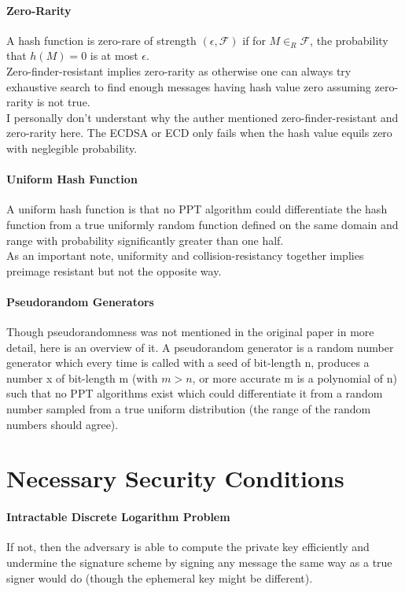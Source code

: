 \documentclass[12]{article}
\begin{document}
\paragraph{Zero-Rarity}
A hash function is zero-rare of strength $(\epsilon, \mathscr{F})$ if for $M\in _R \mathscr{F}$, the probability that $h(M)=0$ is at most $\epsilon$.
\\ Zero-finder-resistant implies zero-rarity as otherwise one can always try exhaustive search to find enough messages having hash value zero assuming zero-rarity is not true.
\\ I personally don't understant why the auther mentioned zero-finder-resistant and zero-rarity here. The ECDSA or ECD only fails when the hash value equils zero with neglegible probability.


\paragraph{Uniform Hash Function}
A uniform hash function is that no PPT algorithm could differentiate the hash function from a true uniformly random function defined on the same domain and range with probability significantly greater than one half.\\

As an important note, uniformity and collision-resistancy together implies preimage resistant but not the opposite way.
\paragraph{Pseudorandom Generators}
Though pseudorandomness was not mentioned in the original paper in more detail, here is an overview of it. A pseudorandom generator is a random number generator which every time is called with a seed of bit-length n, produces a number x of bit-length m (with $m > n$, or more accurate m is a polynomial of n) such that no PPT algorithms exist which could differentiate it from a random number sampled from a true uniform distribution (the range of the random numbers should agree).

\section{Necessary Security Conditions}
\paragraph{Intractable Discrete Logarithm Problem}
If not, then the adversary is able to compute the private key efficiently and undermine the signature scheme by signing any message the same way as a true signer would do (though the ephemeral key might be different).
\end{document}
